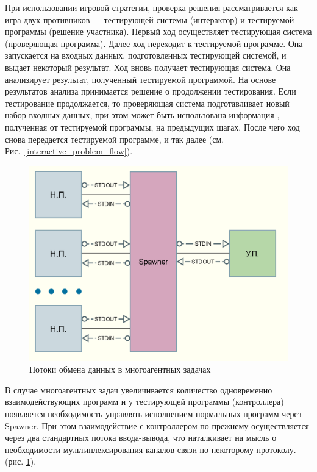 \documentclass{imcs}
\begin{document}
\FloatBarrier

При использовании игровой стратегии, проверка решения рассматривается как игра двух противников — тестирующей системы (интерактор) и тестируемой программы (решение участника). Первый ход осуществляет тестирующая система (проверяющая программа). Далее ход переходит к тестируемой программе. Она запускается на входных данных, подготовленных тестирующей системой, и выдает некоторый результат. Ход вновь получает тестирующая система. Она анализирует результат, полученный тестируемой программой. На основе результатов анализа принимается решение о продолжении тестирования. Если тестирование продолжается, то проверяющая система подготавливает новый набор входных данных,  при этом может быть использована информация , полученная от тестируемой программы, на предыдущих шагах. После чего ход снова передается тестируемой программе, и так далее (см. Рис.~\ref{interactive_problem_flow}). \cite{elizarov}

\FloatBarrier

\begin{figure}[htb]
\centering
\includegraphics[width=\textwidth,keepaspectratio]{./img/multiagent_data_flow.png}
\caption{Потоки обмена данных в многоагентных задачах}
\label{multiagent_data_flow}
\end{figure}

\FloatBarrier

В случае многоагентных задач увеличивается количество одновременно взаимодействующих программ и у тестирующей программы (контроллера) появляется необходимость управлять исполнением нормальных программ через Spawner. При этом взаимодействие с контроллером по прежнему осуществляется через два стандартных потока ввода-вывода, что наталкивает на мысль о необходимости мультиплексирования каналов связи по некоторому протоколу. (рис. \ref{multiagent_data_flow}).
\end{document}
